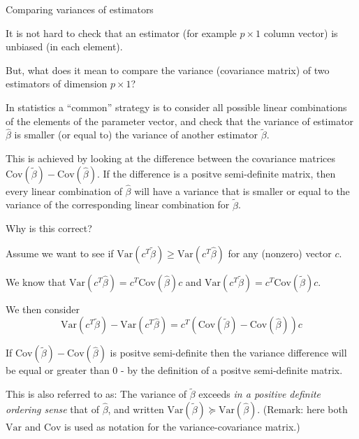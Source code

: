 \documentclass[
  ignorenonframetext,
]{beamer}
\begin{document}
\begin{frame}

\begin{block}{Comparing variances of estimators}

It is not hard to check that an estimator (for example \(p\times 1\)
column vector) is unbiased (in each element).

But, what does it mean to compare the variance (covariance matrix) of
two estimators of dimension \(p \times 1\)?

In statistics a ``common'' strategy is to consider all possible linear
combinations of the elements of the parameter vector, and check that the
variance of estimator \(\hat{\beta}\) is smaller (or equal to) the
variance of another estimator \(\tilde{\beta}\).

This is achieved by looking at the difference between the covariance
matrices \(\text{Cov}(\tilde{\beta})-\text{Cov}(\hat{\beta})\). If the
difference is a positve semi-definite matrix, then every linear
combination of \(\hat{\beta}\) will have a variance that is smaller or
equal to the variance of the corresponding linear combination for
\(\tilde{\beta}\).

\end{block}

\end{frame}

\begin{frame}

\begin{block}{Why is this correct?}

Assume we want to see if
\(\text{Var}(c^T\tilde{\beta})\ge \text{Var}(c^T\hat{\beta})\) for any
(nonzero) vector \(c\).

We know that \(\text{Var}(c^T\hat{\beta})=c^T \text{Cov}(\hat{\beta})c\)
and \(\text{Var}(c^T\tilde{\beta})=c^T \text{Cov}(\tilde{\beta})c\).

We then consider
\[\text{Var}(c^T\tilde{\beta})- \text{Var}(c^T\hat{\beta})=c^T(\text{Cov}(\tilde{\beta})-\text{Cov}(\hat{\beta}))c\]

If \(\text{Cov}(\tilde{\beta})-\text{Cov}(\hat{\beta})\) is positve
semi-definite then the variance difference will be equal or greater than
0 - by the definition of a positve semi-definite matrix.

This is also referred to as: The variance of \(\tilde{\beta}\) exceeds
\emph{in a positive definite ordering sense} that of \(\hat{\beta}\),
and written
\(\text{Var}(\tilde{\beta}) \succeq \text{Var}(\hat{\beta})\). (Remark:
here both \(\text{Var}\) and \(\text{Cov}\) is used as notation for the
variance-covariance matrix.)

\end{block}

\end{frame}
\end{document}
